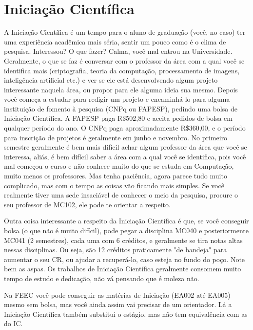 
\section{Iniciação Científica}

A Iniciação Científica é um tempo para o aluno de graduação (você, no caso) ter
uma experiência acadêmica mais séria, sentir um pouco como é o clima de
pesquisa. Interessou? O que fazer? Calma, você mal entrou na Universidade.
Geralmente, o que se faz é conversar com o professor da área com a qual você se
identifica mais (criptografia, teoria da computação, processamento de imagens,
inteligência artificial etc.) e ver se ele está desenvolvendo algum projeto
interessante naquela área, ou propor para ele alguma ideia sua mesmo.
Depois você começa a estudar para redigir um projeto e encaminhá-lo para alguma
instituição de fomento à pesquisa (CNPq ou FAPESP), pedindo uma bolsa de
Iniciação Científica. A FAPESP paga R\$502,80 e aceita pedidos de bolsa em
qualquer período do ano. O CNPq paga aproximadamente R\$360,00, e o período para
inscrição de projetos é geralmente em junho e novembro. No primeiro semestre
geralmente é bem mais difícil achar algum professor da área que você se
interessa, aliás, é bem difícil saber a área com a qual você se identifica, pois
você mal começou o curso e não conhece muito do que se estuda em Computação,
muito menos os professores. Mas tenha paciência, agora parece tudo muito
complicado, mas com o tempo as coisas vão ficando mais simples. Se
você realmente tiver uma sede insaciável de conhecer o meio da pesquisa, procure
o seu professor de MC102, ele pode te orientar a respeito.

Outra coisa interessante a respeito da Iniciação Científica é que, se você
conseguir bolsa (o que não é muito difícil), pode pegar a disciplina MC040
e posteriormente MC041 (2 semestres), cada uma com 6 créditos, e geralmente se
tira notas altas nessas disciplinas. Ou seja, são 12 créditos praticamente "de
bandeja" para aumentar o seu CR, ou ajudar a recuperá-lo, caso esteja no fundo
do poço. Note bem as aspas. Os trabalhos de Iniciação Científica geralmente
consomem muito tempo de estudo e dedicação, não vá pensando que é moleza não.

Na FEEC você pode conseguir as matérias de Iniciação (EA002 até EA005) mesmo sem
bolsa, mas você ainda assim vai precisar de um orientador. Lá a Iniciação
Científica também substitui o estágio, mas não tem equivalência com as do IC.

